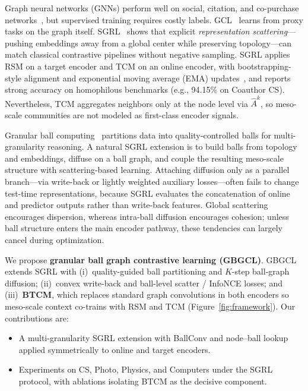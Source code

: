 \documentclass[conference]{IEEEtran}
\begin{document}
Graph neural networks (GNNs) perform well on social, citation, and co-purchase networks~\cite{luo2024tunedgnn}, but supervised training requires costly labels.
GCL~\cite{liu2022graphssl,wu2021self,ju2024gclsurvey,he2024sgrl,xiao2024graphecl} learns from proxy tasks on the graph itself.
SGRL~\cite{he2024sgrl} shows that explicit \emph{representation scattering}---pushing embeddings away from a global center while preserving topology---can match classical contrastive pipelines without negative sampling.
SGRL applies RSM on a target encoder and TCM on an online encoder, with bootstrapping-style alignment and exponential moving average (EMA) updates~\cite{thakoor2021bgrl,sun2024sgcl}, and reports strong accuracy on homophilous benchmarks (e.g., 94.15\% on Coauthor CS).
Nevertheless, TCM aggregates neighbors only at the node level via $\hat{A}^{k}$, so meso-scale communities are not modeled as first-class encoder signals.

Granular ball computing~\cite{xia2025gbrs,xia2022gbgen,xia2023gbsurvey,xia2024gbct,xia2025gbgc,xia2025sgbgc,su2025mgbcc} partitions data into quality-controlled balls for multi-granularity reasoning.
A natural SGRL extension is to build balls from topology and embeddings, diffuse on a ball graph, and couple the resulting meso-scale structure with scattering-based learning.
Attaching diffusion only as a parallel branch---via write-back or lightly weighted auxiliary losses---often fails to change test-time representations, because SGRL evaluates the concatenation of online and predictor outputs rather than write-back features.
Global scattering encourages dispersion, whereas intra-ball diffusion encourages cohesion; unless ball structure enters the main encoder pathway, these tendencies can largely cancel during optimization.

We propose \textbf{granular ball graph contrastive learning (GBGCL)}.
GBGCL extends SGRL with (i)~quality-guided ball partitioning and $K$-step ball-graph diffusion; (ii)~convex write-back and ball-level scatter / InfoNCE losses; and (iii)~\textbf{BTCM}, which replaces standard graph convolutions in both encoders so meso-scale context co-trains with RSM and TCM (Figure~\ref{fig:framework}).
Our contributions are:
\begin{itemize}
  \item A multi-granularity SGRL extension with BallConv and node--ball lookup applied symmetrically to online and target encoders.
  \item Experiments on CS, Photo, Physics, and Computers under the SGRL protocol, with ablations isolating BTCM as the decisive component.
\end{itemize}
\end{document}
